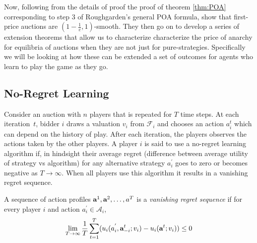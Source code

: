 \documentclass[12pt,twoside]{reedthesis}
\begin{document}
Now, following from the details of proof the proof of theorem \ref{thm:POA} corresponding to step 3 of Roughgarden's general POA formula, \cite{Roughgarden2017} show that first-price auctions are $(1-\frac{1}{e}, 1)$-smooth. They then go on to develop a series of extension theorems that allow us to characterize characterize the price of anarchy for equilibria of auctions when they are not just for pure-strategies. Specifically we will be looking at how these can be extended a set of outcomes for agents who learn to play the game as they go.



\subsection{No-Regret Learning}
Consider an auction with $n$ players that is repeated for $T$ time steps. At each iteration~$t$, bidder $i$ draws a valuation $v_i$ from $\mathcal{F}_i$ and chooses an action $a_i^t$ which can depend on the history of play. After each iteration, the players observes the actions taken by the other players. 
A player $i$ is said to use a no-regret learning algorithm if, in hindsight their average regret (difference between average utility of strategy vs algorithm) for any alternative strategy $a_i^{'}$ goes to zero or becomes negative as $T \rightarrow \infty$. When all players use this algorithm it results in a vanishing regret sequence.

\begin{dfn}
	A sequence of action profiles $\textbf{a}^1 , \textbf{a}^2, \ldots, a^T$ is a \textit{vanishing regret sequence} if for every player $i$ and action $a_i^{'} \in \mathcal{A}_i$,
	$$ \lim\limits_{T \rightarrow \infty} \frac{1}{T} \sum_{t=1}^{T}(u_i(a_i^{'}, \textbf{a}_{-i}^{t};v_i) - u_i(\textbf{a}^t; v_i)) \leq 0$$
	\label{dfn:noregret} 
\end{dfn}
\end{document}
